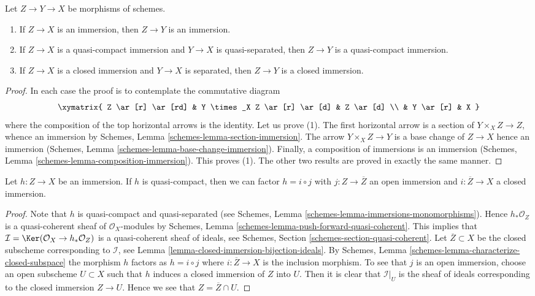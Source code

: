 \begin{lemma}
\label{lemma-immersion-permanence}
Let $Z \to Y \to X$ be morphisms of schemes.
\begin{enumerate}
\item If $Z \to X$ is an immersion, then $Z \to Y$ is an immersion.
\item If $Z \to X$ is a quasi-compact immersion and $Y \to X$ is
quasi-separated, then $Z \to Y$ is a quasi-compact immersion.
\item If $Z \to X$ is a closed immersion and $Y \to X$ is separated,
then $Z \to Y$ is a closed immersion.
\end{enumerate}
\end{lemma}

\begin{proof}
In each case the proof is to contemplate the commutative diagram
$$
\xymatrix{
Z \ar[r] \ar[rd] & Y \times_X Z \ar[r] \ar[d] & Z \ar[d] \\
& Y \ar[r] & X
}
$$
where the composition of the top horizontal arrows is the identity.
Let us prove (1). The first horizontal arrow is a section of
$Y \times_X Z \to Z$, whence an immersion by
Schemes, Lemma \ref{schemes-lemma-section-immersion}.
The arrow $Y \times_X Z \to Y$ is a base change of $Z \to X$ hence
an immersion (Schemes, Lemma \ref{schemes-lemma-base-change-immersion}).
Finally, a composition of immersions is an immersion
(Schemes, Lemma \ref{schemes-lemma-composition-immersion}). This proves (1).
The other two results are proved in exactly the same manner.
\end{proof}

\begin{lemma}
\label{lemma-factor-quasi-compact-immersion}
Let $h : Z \to X$ be an immersion.
If $h$ is quasi-compact, then we can factor
$h = i \circ j$ with $j : Z \to \overline{Z}$ an
open immersion and $i : \overline{Z} \to X$ a closed immersion.
\end{lemma}

\begin{proof}
Note that $h$ is quasi-compact and quasi-separated (see
Schemes, Lemma \ref{schemes-lemma-immersions-monomorphisms}).
Hence $h_*\mathcal{O}_Z$ is a quasi-coherent sheaf of $\mathcal{O}_X$-modules
by Schemes, Lemma \ref{schemes-lemma-push-forward-quasi-coherent}.
This implies that
$\mathcal{I} = \Ker(\mathcal{O}_X \to h_*\mathcal{O}_Z)$
is a quasi-coherent sheaf of ideals, see
Schemes, Section \ref{schemes-section-quasi-coherent}.
Let $\overline{Z} \subset X$ be the closed subscheme corresponding
to $\mathcal{I}$, see Lemma \ref{lemma-closed-immersion-bijection-ideals}.
By Schemes, Lemma \ref{schemes-lemma-characterize-closed-subspace}
the morphism $h$ factors as
$h = i \circ j$ where $i : \overline{Z} \to X$ is the inclusion morphism.
To see that $j$ is an open immersion, choose an open subscheme
$U \subset X$ such that $h$ induces a closed immersion of $Z$
into $U$. Then it is clear that $\mathcal{I}|_U$ is the
sheaf of ideals corresponding to the closed immersion $Z \to U$.
Hence we see that $Z = \overline{Z} \cap U$.
\end{proof}

